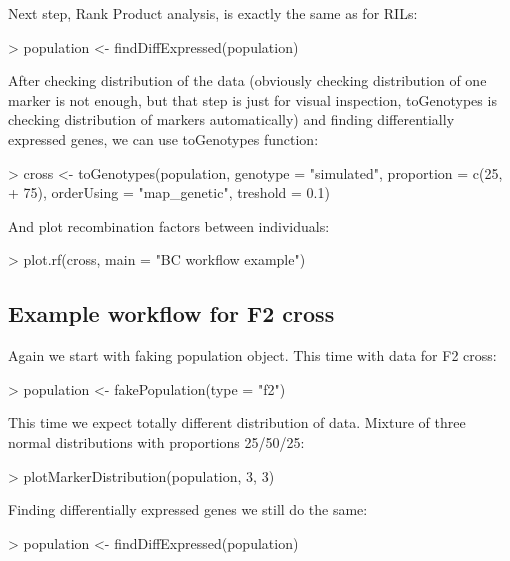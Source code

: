 \documentclass{article}
\begin{document}
{\noindent}Next step, Rank Product analysis, is exactly the same as for RILs:
\begin{Schunk}
\begin{Sinput}
> population <- findDiffExpressed(population)
\end{Sinput}
\end{Schunk}

\newpage
{\noindent}After checking distribution of the data (obviously checking distribution of one marker is not enough, but that step is just for visual inspection, toGenotypes is
checking distribution of markers automatically) and finding differentially expressed genes, we can use toGenotypes function:
\begin{Schunk}
\begin{Sinput}
> cross <- toGenotypes(population, genotype = "simulated", proportion = c(25, 
+     75), orderUsing = "map_genetic", treshold = 0.1)
\end{Sinput}
\end{Schunk}

{\noindent}And plot recombination factors between individuals:
\begin{Schunk}
\begin{Sinput}
> plot.rf(cross, main = "BC workflow example")
\end{Sinput}
\end{Schunk}

\newpage
\subsection{Example workflow for F2 cross}
{\noindent}Again we start with faking population object. This time with data for F2 cross:
\begin{Schunk}
\begin{Sinput}
> population <- fakePopulation(type = "f2")
\end{Sinput}
\end{Schunk}

{\noindent}This time we expect totally different distribution of data. Mixture of three normal distributions with proportions 25/50/25:
\begin{Schunk}
\begin{Sinput}
> plotMarkerDistribution(population, 3, 3)
\end{Sinput}
\end{Schunk}

{\noindent}Finding differentially expressed genes we still do the same:
\begin{Schunk}
\begin{Sinput}
> population <- findDiffExpressed(population)
\end{Sinput}
\end{Schunk}
\end{document}

